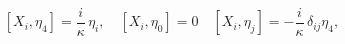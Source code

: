\begin{equation}\label{13}
  [X_i, \eta_4] = \frac{i}\kappa\, \eta_i,\quad  [X_i, \eta_0] =0
  \quad [X_i, \eta_j] = -\frac{i}\kappa\,
\delta_{ij}  \eta_4,
\end{equation}

